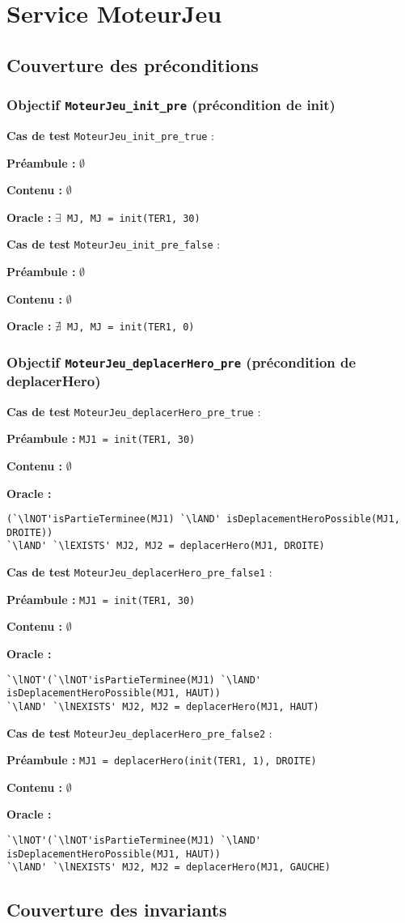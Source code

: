 \documentclass{article}
\newcommand{\cmd}[1]{\texttt{#1}}
\newcommand{\lAND}{$\land$}
\newcommand{\lNOT}{$\lnot$}
\newcommand{\lEXISTS}{$\exists$}
\newcommand{\lNEXISTS}{$\nexists{}$}
\newcommand{\obj}[2]{\subsubsection*{\large{\textbf{Objectif {\cmd{#1} (#2)}}}}}
\newenvironment{cas}[1]
{
	\hspace{1em}\textbf{Cas de test} \cmd{#1} :
	\begin{list}{}{}
}{
	\end{list}\vspace{1em}
}
\newcommand{\pre}[1]{\item \textbf{Préambule :} \cmd{#1}}
\newcommand{\npre}{\item \textbf{Préambule :} $\emptyset$}
\newcommand{\nope}{\item \textbf{Contenu :} $\emptyset$}
\newcommand{\ora}[1]{\item \textbf{Oracle :} \cmd{#1}}
\newcommand{\oram}{\item \textbf{Oracle :}}
\begin{document}
\section{Service MoteurJeu}


\subsection*{Couverture des préconditions}

\obj{MoteurJeu\_init\_pre} {précondition de init}
	\begin{cas} {MoteurJeu\_init\_pre\_true}
		\npre{}
		\nope{}
		\ora{\lEXISTS{} MJ, MJ = init(TER1, 30)}
	\end{cas}

	\begin{cas} {MoteurJeu\_init\_pre\_false}
		\npre{}
		\nope{}
		\ora{\lNEXISTS{} MJ, MJ = init(TER1, 0)}
	\end{cas}


\obj{MoteurJeu\_deplacerHero\_pre} {précondition de deplacerHero}
	\begin{cas} {MoteurJeu\_deplacerHero\_pre\_true}
		\pre{MJ1 = init(TER1, 30)}
		\nope{}
		\oram{}
		\begin{lstlisting}
(`\lNOT'isPartieTerminee(MJ1) `\lAND' isDeplacementHeroPossible(MJ1, DROITE))
`\lAND' `\lEXISTS' MJ2, MJ2 = deplacerHero(MJ1, DROITE)
		\end{lstlisting}
	\end{cas}

	\begin{cas} {MoteurJeu\_deplacerHero\_pre\_false1}
		\pre{MJ1 = init(TER1, 30)}
		\nope{}
		\oram{}
		\begin{lstlisting}
`\lNOT'(`\lNOT'isPartieTerminee(MJ1) `\lAND' isDeplacementHeroPossible(MJ1, HAUT))
`\lAND' `\lNEXISTS' MJ2, MJ2 = deplacerHero(MJ1, HAUT)
		\end{lstlisting}
	\end{cas}

	\begin{cas} {MoteurJeu\_deplacerHero\_pre\_false2}
		\pre{MJ1 = deplacerHero(init(TER1, 1), DROITE)}
		\nope{}
		\oram{}
		\begin{lstlisting}
`\lNOT'(`\lNOT'isPartieTerminee(MJ1) `\lAND' isDeplacementHeroPossible(MJ1, HAUT))
`\lAND' `\lNEXISTS' MJ2, MJ2 = deplacerHero(MJ1, GAUCHE)
		\end{lstlisting}
	\end{cas}


\subsection*{Couverture des invariants}
\end{document}
